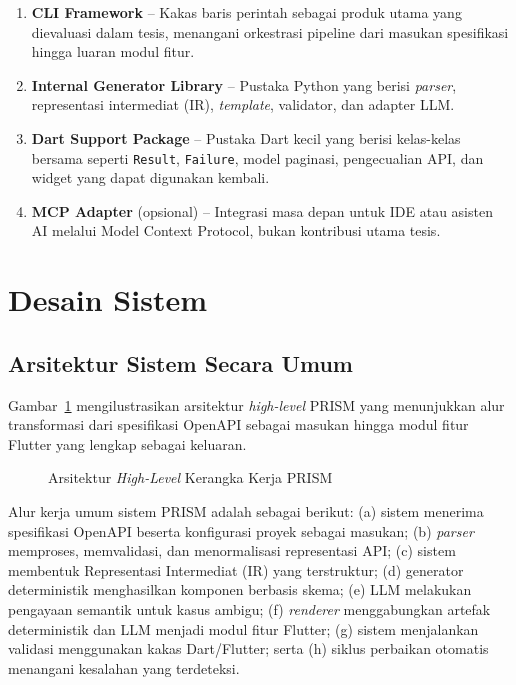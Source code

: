 \begin{enumerate}
    \item \textbf{CLI Framework} -- Kakas baris perintah sebagai produk utama yang dievaluasi dalam tesis, menangani orkestrasi pipeline dari masukan spesifikasi hingga luaran modul fitur.
    \item \textbf{Internal Generator Library} -- Pustaka Python yang berisi \textit{parser}, representasi intermediat (IR), \textit{template}, validator, dan adapter LLM.
    \item \textbf{Dart Support Package} -- Pustaka Dart kecil yang berisi kelas-kelas bersama seperti \texttt{Result}, \texttt{Failure}, model paginasi, pengecualian API, dan widget yang dapat digunakan kembali.
    \item \textbf{MCP Adapter} (opsional) -- Integrasi masa depan untuk IDE atau asisten AI melalui Model Context Protocol, bukan kontribusi utama tesis.
\end{enumerate}

\section{Desain Sistem}

\subsection{Arsitektur Sistem Secara Umum}

Gambar~\ref{fig:arsitektur} mengilustrasikan arsitektur \textit{high-level} PRISM yang menunjukkan alur transformasi dari spesifikasi OpenAPI sebagai masukan hingga modul fitur Flutter yang lengkap sebagai keluaran.

\begin{figure}[H]
    \centering
    \caption{Arsitektur \textit{High-Level} Kerangka Kerja PRISM}
    \label{fig:arsitektur}
\end{figure}

Alur kerja umum sistem PRISM adalah sebagai berikut: (a) sistem menerima spesifikasi OpenAPI beserta konfigurasi proyek sebagai masukan; (b) \textit{parser} memproses, memvalidasi, dan menormalisasi representasi API; (c) sistem membentuk Representasi Intermediat (IR) yang terstruktur; (d) generator deterministik menghasilkan komponen berbasis skema; (e) LLM melakukan pengayaan semantik untuk kasus ambigu; (f) \textit{renderer} menggabungkan artefak deterministik dan LLM menjadi modul fitur Flutter; (g) sistem menjalankan validasi menggunakan kakas Dart/Flutter; serta (h) siklus perbaikan otomatis menangani kesalahan yang terdeteksi.

